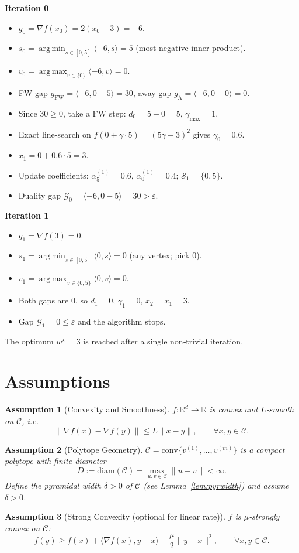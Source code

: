 \documentclass{article}
\newtheorem{assumption}{Assumption}
\newcommand{\gap}{\mathcal{G}}
\newcommand{\diam}{\mathrm{diam}}
\newcommand{\conv}{\mathrm{conv}}
\newcommand{\argmin}{\operatorname*{arg\,min}}
\newcommand{\argmax}{\operatorname*{arg\,max}}
\begin{document}
\noindent\textbf{Iteration 0}
\begin{itemize}
    \item $g_0=\nabla f(x_0)=2(x_0-3)=-6$.
    \item $s_0=\argmin_{s\in[0,5]}\langle -6,s\rangle =5$ (most negative inner product).
    \item $v_0=\argmax_{v\in\{0\}}\langle -6,v\rangle =0$.
    \item FW gap $g_{\text{FW}}=\langle -6,0-5\rangle =30$, away gap $g_{\text{A}}=\langle -6,0-0\rangle =0$.
    \item Since $30\ge0$, take a FW step: $d_0=5-0=5$, $\gamma_{\max}=1$.
    \item Exact line‑search on $f(0+\gamma\cdot5)=(5\gamma-3)^2$ gives $\gamma_0=0.6$.
    \item $x_1=0+0.6\cdot5=3$.
    \item Update coefficients: $\alpha^{(1)}_{5}=0.6$, $\alpha^{(1)}_{0}=0.4$; $\mathcal{S}_1=\{0,5\}$.
    \item Duality gap $\gap_0=\langle -6,0-5\rangle =30> \varepsilon$.
\end{itemize}
\noindent\textbf{Iteration 1}
\begin{itemize}
    \item $g_1=\nabla f(3)=0$.
    \item $s_1=\argmin_{s\in[0,5]}\langle 0,s\rangle =0$ (any vertex; pick $0$).
    \item $v_1=\argmax_{v\in\{0,5\}}\langle 0,v\rangle =0$.
    \item Both gaps are $0$, so $d_1=0$, $\gamma_1=0$, $x_2=x_1=3$.
    \item Gap $\gap_1=0\le\varepsilon$ and the algorithm stops.
\end{itemize}
The optimum $w^\star=3$ is reached after a single non‑trivial iteration.

\newpage
\section*{Assumptions}
\begin{assumption}[Convexity and Smoothness]\label{ass:convex}
$f:\mathbb{R}^d\to\mathbb{R}$ is convex and $L$‑smooth on $\mathcal{C}$, i.e.
\[
\|\nabla f(x)-\nabla f(y)\| \le L\|x-y\|,\qquad \forall x,y\in\mathcal{C}.
\]
\end{assumption}
\begin{assumption}[Polytope Geometry]\label{ass:polytope}
$\mathcal{C}=\conv\{v^{(1)},\dots ,v^{(m)}\}$ is a compact polytope with finite diameter
\[
D:=\diam(\mathcal{C})=\max_{u,v\in\mathcal{C}}\|u-v\|<\infty .
\]
Define the \emph{pyramidal width} $\delta>0$ of $\mathcal{C}$ (see Lemma~\ref{lem:pyrwidth}) and assume $\delta>0$.
\end{assumption}
\begin{assumption}[Strong Convexity (optional for linear rate)]\label{ass:strong}
$f$ is $\mu$‑strongly convex on $\mathcal{C}$:
\[
f(y)\ge f(x)+\langle \nabla f(x),y-x\rangle +\frac{\mu}{2}\|y-x\|^2,\qquad \forall x,y\in\mathcal{C}.
\]
\end{assumption}
\end{document}
